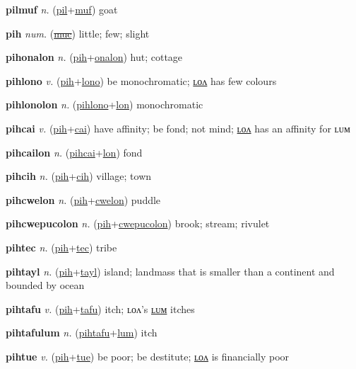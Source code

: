 \textbf{\hypertarget{pilmuf}{pilmuf}} \textit{n.} (\hyperlink{pil}{pil}+\allowbreak \hyperlink{muf}{muf})
goat

\textbf{\hypertarget{pih}{pih}} \textit{num.} (\hyperlink{muc}{\sout{muc}})
little; few; slight

\textbf{\hypertarget{pihonalon}{pihonalon}} \textit{n.} (\hyperlink{pih}{pih}+\allowbreak \hyperlink{onalon}{onalon})
hut; cottage

\textbf{\hypertarget{pihlono}{pihlono}} \textit{v.} (\hyperlink{pih}{pih}+\allowbreak \hyperlink{lono}{lono})
be monochromatic; \hyperlink{pihlonolon}{ʟᴏᴧ} has few colours

\textbf{\hypertarget{pihlonolon}{pihlonolon}} \textit{n.} (\hyperlink{pihlono}{pihlono}+\allowbreak \hyperlink{lon}{lon})
monochromatic

\textbf{\hypertarget{pihcai}{pihcai}} \textit{v.} (\hyperlink{pih}{pih}+\allowbreak \hyperlink{cai}{cai})
have affinity; be fond; not mind; \hyperlink{pihcailon}{ʟᴏᴧ} has an affinity for ʟᴜᴍ

\textbf{\hypertarget{pihcailon}{pihcailon}} \textit{n.} (\hyperlink{pihcai}{pihcai}+\allowbreak \hyperlink{lon}{lon})
fond

\textbf{\hypertarget{pihcih}{pihcih}} \textit{n.} (\hyperlink{pih}{pih}+\allowbreak \hyperlink{cih}{cih})
village; town

\textbf{\hypertarget{pihcwelon}{pihcwelon}} \textit{n.} (\hyperlink{pih}{pih}+\allowbreak \hyperlink{cwelon}{cwelon})
puddle

\textbf{\hypertarget{pihcwepucolon}{pihcwepucolon}} \textit{n.} (\hyperlink{pih}{pih}+\allowbreak \hyperlink{cwepucolon}{cwepucolon})
brook; stream; rivulet

\textbf{\hypertarget{pihtec}{pihtec}} \textit{n.} (\hyperlink{pih}{pih}+\allowbreak \hyperlink{tec}{tec})
tribe

\textbf{\hypertarget{pihtayl}{pihtayl}} \textit{n.} (\hyperlink{pih}{pih}+\allowbreak \hyperlink{tayl}{tayl})
island; landmass that is smaller than a continent and bounded by ocean

\textbf{\hypertarget{pihtafu}{pihtafu}} \textit{v.} (\hyperlink{pih}{pih}+\allowbreak \hyperlink{tafu}{tafu})
itch; ʟᴏᴧ’s \hyperlink{pihtafulum}{ʟᴜᴍ} itches

\textbf{\hypertarget{pihtafulum}{pihtafulum}} \textit{n.} (\hyperlink{pihtafu}{pihtafu}+\allowbreak \hyperlink{lum}{lum})
itch

\textbf{\hypertarget{pihtue}{pihtue}} \textit{v.} (\hyperlink{pih}{pih}+\allowbreak \hyperlink{tue}{tue})
be poor; be destitute; \hyperlink{pihtuelon}{ʟᴏᴧ} is financially poor

